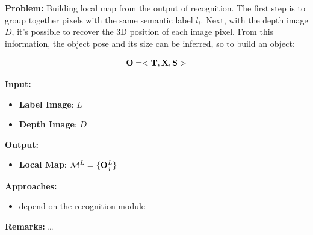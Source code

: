 \documentclass{article}
\begin{document}
	{\bf Problem: } Building local map from the output of recognition. The first step is to group together pixels with the same semantic label $l_i$. Next, with the depth image $D$, it's possible to recover the 3D position of each image pixel. From this information, the object pose and its size can be inferred, so to build an object:
	
	\begin{equation}
	 \mathbf{O} = < \mathbf{T}, \mathbf{X}, \mathbf{S} > 
	\end{equation}
	
	\noindent
	{\bf Input: }
	\begin{itemize}
		\item {\bf Label Image}: $L$
		\item {\bf Depth Image}: $D$
	\end{itemize}
	\noindent
	{\bf Output: }
	\begin{itemize}
		\item {\bf Local Map}: $\mathcal{M}^L = \{ \mathbf{O}_j^L \}$
	\end{itemize}
	\noindent
	{\bf Approaches: }
	\begin{itemize}
		\item depend on the recognition module
	\end{itemize}
	\noindent
	{\bf Remarks: } \dots
	
\end{document}
